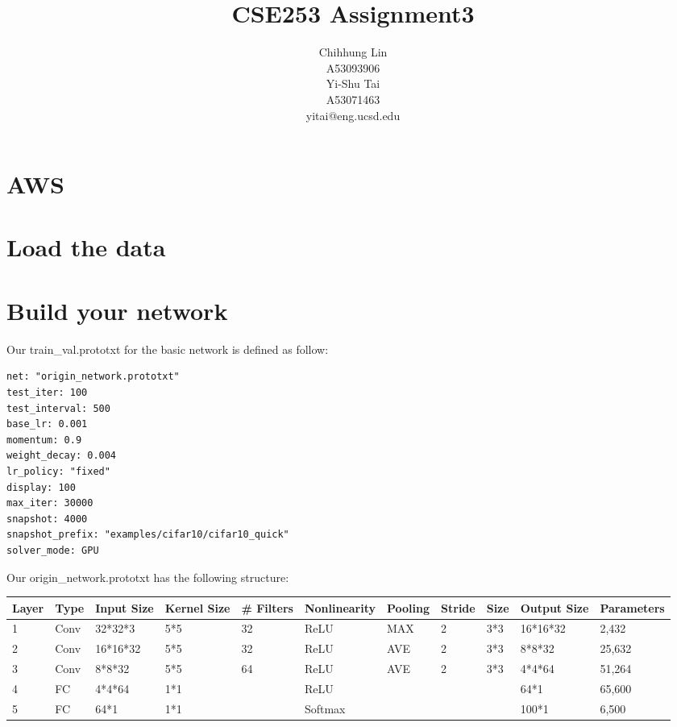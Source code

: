 \documentclass{article} %
\title{CSE253 Assignment3}
\author{
Chihhung Lin\\
A53093906\\
\And
Yi-Shu Tai \\
A53071463\\
yitai@eng.ucsd.edu
}
\begin{document}
\maketitle
\section{AWS}
\section{Load the data}
\section{Build your network}
Our train\_val.prototxt for the basic network is defined as follow:
\begin{lstlisting}
net: "origin_network.prototxt"
test_iter: 100 
test_interval: 500 
base_lr: 0.001
momentum: 0.9 
weight_decay: 0.004
lr_policy: "fixed"
display: 100 
max_iter: 30000
snapshot: 4000
snapshot_prefix: "examples/cifar10/cifar10_quick"
solver_mode: GPU 
\end{lstlisting}
Our origin\_network.prototxt has the following structure:
\begin{table}[H]
    \begin{tabular}{|l|l|l|l|l|l|l|l|l|l|l|}
    \hline
    Layer & Type & Input Size & Kernel Size & \# Filters & Nonlinearity & Pooling & Stride & Size & Output Size & Parameters \\ \hline
    1     & Conv & 32*32*3    & 5*5         & 32         & ReLU         & MAX     & 2      & 3*3  & 16*16*32    & 2,432      \\ \hline
    2     & Conv & 16*16*32   & 5*5         & 32         & ReLU         & AVE     & 2      & 3*3  & 8*8*32      & 25,632     \\ \hline
    3     & Conv & 8*8*32     & 5*5         & 64         & ReLU         & AVE     & 2      & 3*3  & 4*4*64      & 51,264     \\ \hline
    4     & FC   & 4*4*64     & 1*1         & ~          & ReLU         & ~       & ~      & ~    & 64*1        & 65,600     \\ \hline
    5     & FC   & 64*1       & 1*1         & ~          & Softmax      & ~       & ~      & ~    & 100*1       & 6,500      \\ \hline
    \end{tabular}
\end{table}
\end{document}
